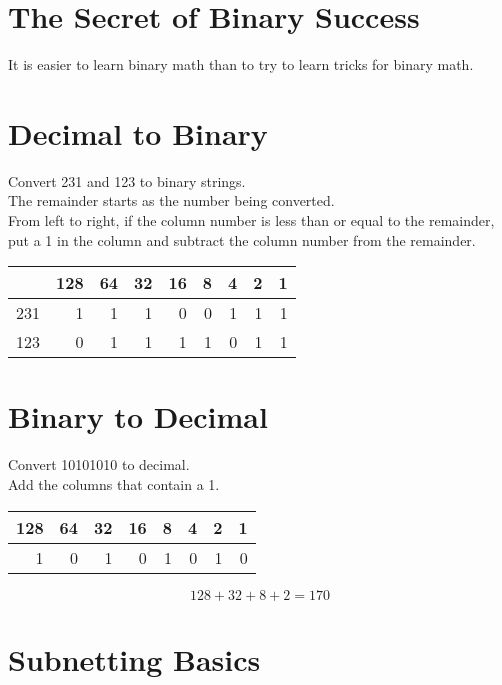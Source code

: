 \documentclass{article}
\begin{document}
\section{The Secret of Binary Success}

It is easier to learn binary math than to try to learn tricks for binary math.

\section{Decimal to Binary}

Convert 231 and 123 to binary strings.\\

The remainder starts as the number being converted.\\

From left to right, if the column number is less than or equal to the
remainder, put a 1 in the column and subtract the column number from the
remainder.\\

\begin{tabular}{ | r | r | r | r | r | r | r | r | r | }
\hline
    & 128 & 64 & 32 & 16 & 8 & 4 & 2 & 1 \\ \hline
231 &   1 &  1 &  1 &  0 & 0 & 1 & 1 & 1 \\ \hline
123 &   0 &  1 &  1 &  1 & 1 & 0 & 1 & 1 \\ \hline
\end{tabular}

\section{Binary to Decimal}

Convert 10101010 to decimal.\\

Add the columns that contain a 1.\\

\begin{tabular}{ | r | r | r | r | r | r | r | r | }
\hline
128 & 64 & 32 & 16 & 8 & 4 & 2 & 1 \\ \hline
  1 &  0 &  1 &  0 & 1 & 0 & 1 & 0 \\ \hline
\end{tabular}

\begin{equation}
128 + 32 + 8 + 2 = 170
\end{equation}

\section{Subnetting Basics}
\end{document}
